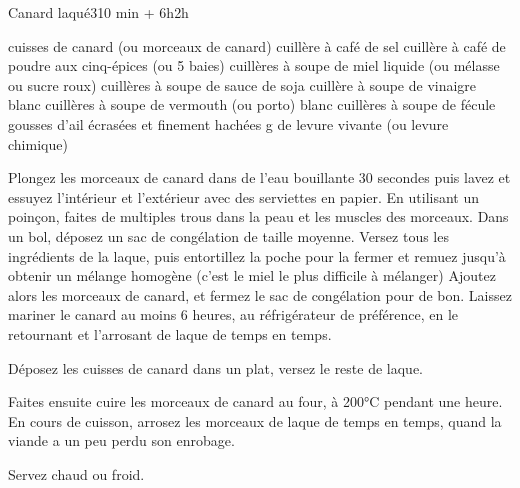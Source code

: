 \begin{recette}{Canard laqué}{3}{10 min + 6h}{2h}

\begin{ingredients}
 cuisses de canard (ou morceaux de canard)
 cuillère à café de sel
 cuillère à café de poudre aux cinq-épices (ou 5 baies)
 cuillères à soupe de miel liquide (ou mélasse ou sucre roux)
 cuillères à soupe de sauce de soja
 cuillère à soupe de vinaigre blanc
 cuillères à soupe de vermouth (ou porto) blanc
 cuillères à soupe de fécule
 gousses d'ail écrasées et finement hachées
 g de levure vivante (ou levure chimique)
\end{ingredients}

\begin{preparation}
\etape Plongez les morceaux de canard dans de l'eau bouillante 30 secondes puis lavez et essuyez l'intérieur et l'extérieur avec des serviettes en papier.
\etape En utilisant un poinçon, faites de multiples trous dans la peau et les muscles des morceaux.
\etape Dans un bol, déposez un sac de congélation de taille moyenne. Versez tous les ingrédients de la laque, puis entortillez la poche pour la fermer et remuez jusqu'à obtenir un mélange homogène (c'est le miel le plus difficile à mélanger)
\etape Ajoutez alors les morceaux de canard, et fermez le sac de congélation pour de bon.
\etape Laissez mariner le canard au moins 6 heures, au réfrigérateur de préférence, en le retournant et l'arrosant de laque de temps en temps.
\end{preparation}

\begin{cuisson}
Déposez les cuisses de canard dans un plat, versez le reste de laque.

Faites ensuite cuire les morceaux de canard au four, à 200°C pendant une heure. En cours de cuisson, arrosez les morceaux de laque de temps en temps, quand la viande a un peu perdu son enrobage. 

Servez chaud ou froid.
\end{cuisson}
\end{recette}


